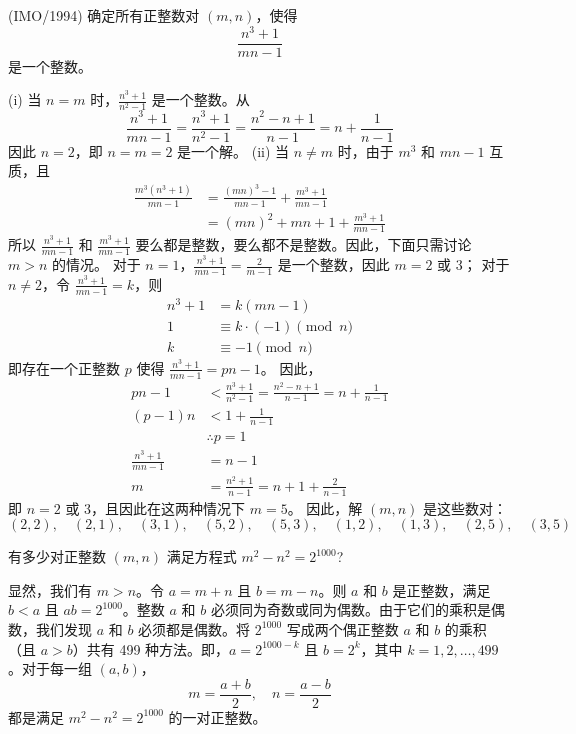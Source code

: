 \begin{questions}
\question (IMO/1994) 确定所有正整数对 $(m,n)$，使得
\[
\frac{n^3+1}{mn-1}
\]
是一个整数。

\begin{solution}
(i) 当 $n=m$ 时，$\frac{n^3+1}{n^2-1}$ 是一个整数。从
\[
\frac{n^3+1}{mn-1} = \frac{n^3+1}{n^2-1} = \frac{n^2-n+1}{n-1} = n + \frac{1}{n-1}
\]
因此 $n=2$，即 $n=m=2$ 是一个解。
(ii) 当 $n \neq m$ 时，由于 $m^3$ 和 $mn-1$ 互质，且
\begin{align*}
\frac{m^3(n^3+1)}{mn-1} &= \frac{(mn)^3-1}{mn-1} + \frac{m^3+1}{mn-1} \\
&= (mn)^2+mn+1+\frac{m^3+1}{mn-1}
\end{align*}
所以 $\frac{n^3+1}{mn-1}$ 和 $\frac{m^3+1}{mn-1}$ 要么都是整数，要么都不是整数。因此，下面只需讨论 $m>n$ 的情况。
对于 $n=1$，$\frac{n^3+1}{mn-1}=\frac{2}{m-1}$ 是一个整数，因此 $m=2$ 或 3；
对于 $n \neq 2$，令 $\frac{n^3+1}{mn-1}=k$，则
\begin{align*}
n^3+1 &= k(mn-1) \\
1 &\equiv k \cdot (-1) \pmod{n} \\
k &\equiv -1 \pmod{n}
\end{align*}
即存在一个正整数 $p$ 使得 $\frac{n^3+1}{mn-1}=pn-1$。
因此，
\begin{align*}
pn-1 &< \frac{n^3+1}{n^2-1} = \frac{n^2-n+1}{n-1} = n + \frac{1}{n-1} \\
(p-1)n &< 1 + \frac{1}{n-1} \\
&\therefore p=1 \\
\frac{n^3+1}{mn-1} &= n-1 \\
m &= \frac{n^2+1}{n-1} = n+1+\frac{2}{n-1}
\end{align*}
即 $n=2$ 或 3，且因此在这两种情况下 $m=5$。
因此，解 $(m,n)$ 是这些数对：
\[
(2,2), \quad (2,1), \quad (3,1), \quad (5,2), \quad (5,3), \quad (1,2), \quad (1,3), \quad (2,5), \quad (3,5)
\]
\end{solution}

\question 有多少对正整数 $(m, n)$ 满足方程式 $m^2 - n^2 = 2^{1000}$?

\begin{solution}
显然，我们有 $m > n$。令 $a = m + n$ 且 $b = m - n$。则 $a$ 和 $b$ 是正整数，满足 $b < a$ 且 $ab = 2^{1000}$。整数 $a$ 和 $b$ 必须同为奇数或同为偶数。由于它们的乘积是偶数，我们发现 $a$ 和 $b$ 必须都是偶数。将 $2^{1000}$ 写成两个偶正整数 $a$ 和 $b$ 的乘积（且 $a > b$）共有 499 种方法。即，$a = 2^{1000-k}$ 且 $b = 2^k$，其中 $k = 1, 2, \ldots, 499$。对于每一组 $(a, b)$，
\[
m = \frac{a + b}{2}, \quad n = \frac{a - b}{2}
\]
都是满足 $m^2 - n^2 = 2^{1000}$ 的一对正整数。
\end{solution}


\end{questions}
